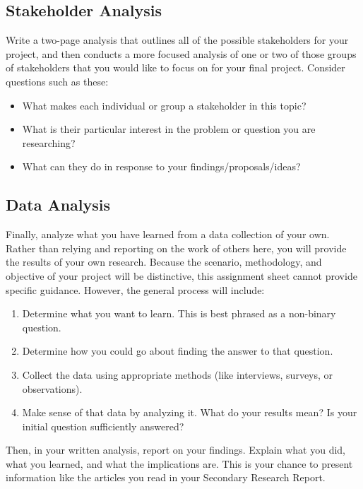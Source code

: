 \documentclass[11pt, twosides]{amsart}	%
\begin{document}
\subsection{Stakeholder Analysis} %
\label{sub:stakeholder_analysis}
Write a two-page analysis that outlines all of the possible stakeholders for your project, and then conducts a more focused analysis of one or two of those groups of stakeholders that you would like to focus on for your final project. Consider questions such as these:
	\begin{itemize}
		\item What makes each individual or group a stakeholder in this topic?
		\item  What is their particular interest in the problem or question you are researching?
		\item  What can they do in response to your findings/proposals/ideas?
	\end{itemize}

\subsection{Data Analysis} %
\label{sub:data_analysis}
Finally, analyze what you have learned from a data collection of your own. Rather than relying and reporting on the work of others here, you will provide the results of your own research. Because the scenario, methodology, and objective of your project will be distinctive, this assignment sheet cannot provide specific guidance. However, the general process will include:
\begin{enumerate}
	\item Determine what you want to learn. This is best phrased as a non-binary question.
	\item Determine how you could go about finding the answer to that question.
	\item Collect the data using appropriate methods (like interviews, surveys, or observations).
	\item Make sense of that data by analyzing it. What do your results mean? Is your initial question sufficiently answered?
\end{enumerate}

Then, in your written analysis, report on your findings. Explain what you did, what you learned, and what the implications are. This is your chance to present information like the articles you read in your Secondary Research Report.
\end{document}
